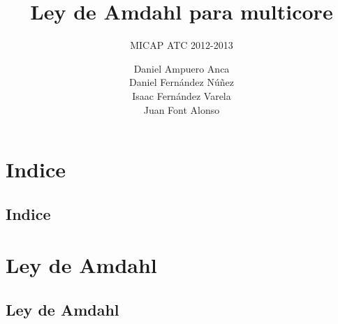 \documentclass[utf8]{beamer}
\title{Ley de Amdahl para multicore}
\subtitle{MICAP ATC 2012-2013}
\author[]{Daniel Ampuero Anca \\ Daniel Fernández Núñez \\ Isaac Fernández Varela \\ Juan Font Alonso}
\date[7 de enero de 2012] %
\begin{document}
\renewcommand{\figurename}{Figura} 


\begin{frame}
    \maketitle
\end{frame}

\section*{Indice}
\subsection*{Indice}
\begin{frame}
    \tableofcontents
\end{frame}

\section{Ley de Amdahl}

\subsection*{Ley de Amdahl}
\end{document}
